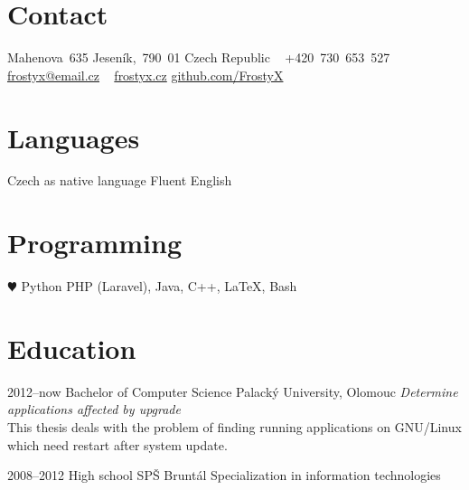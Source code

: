 \documentclass[]{friggeri-cv}
\begin{document}



\begin{aside} %
\section{Contact}
Mahenova~635
Jeseník,~790~01
Czech Republic
~
+420~730~653~527
\href{mailto:frostyx@email.cz}{frostyx@email.cz}
~
\href{http://frostyx.cz}{frostyx.cz}
\href{https://github.com/FrostyX}{github.com/FrostyX}
\section{Languages}
Czech as native language
Fluent English
\section{Programming}
{\color{red} $\varheartsuit$} Python
PHP (Laravel), Java,
C++, LaTeX, Bash
\end{aside}



\section{Education}

\begin{entrylist}

\entry
{2012--now}
{Bachelor {\normalfont of Computer Science}}
{Palacký University, Olomouc}
{\emph{Determine applications affected by upgrade} \\ This thesis deals with the problem of finding running applications on GNU/Linux which need restart after system update.}

\entry
{2008--2012}
{{\normalfont High school}}
{SPŠ Bruntál}
{Specialization in information technologies}

\end{entrylist}


\end{document}

